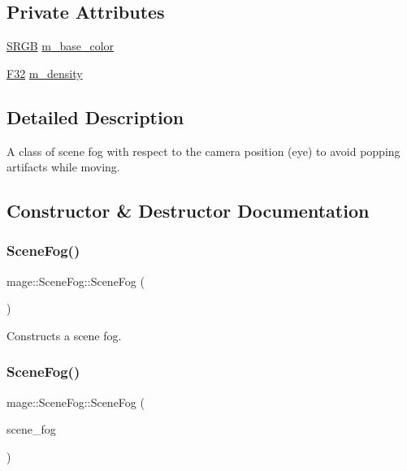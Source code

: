 \subsection*{Private Attributes}
\begin{DoxyCompactItemize}
\item 
\hyperlink{structmage_1_1_s_r_g_b}{S\+R\+GB} \hyperlink{classmage_1_1_scene_fog_aa5440867e5dc3dda9532899e98ff44ae}{m\+\_\+base\+\_\+color}
\item 
\hyperlink{namespacemage_aa97e833b45f06d60a0a9c4fc22ae02c0}{F32} \hyperlink{classmage_1_1_scene_fog_a16d4e67f373716f100ed6809c387b74c}{m\+\_\+density}
\end{DoxyCompactItemize}


\subsection{Detailed Description}
A class of scene fog with respect to the camera position (eye) to avoid popping artifacts while moving. 

\subsection{Constructor \& Destructor Documentation}
\hypertarget{classmage_1_1_scene_fog_a54e3afb5450b6c5bec90448aebcd63a5}{}\label{classmage_1_1_scene_fog_a54e3afb5450b6c5bec90448aebcd63a5} 
\subsubsection{\texorpdfstring{Scene\+Fog()}{SceneFog()}\hspace{0.1cm}{\footnotesize\ttfamily [1/3]}}
{\footnotesize\ttfamily mage\+::\+Scene\+Fog\+::\+Scene\+Fog (\begin{DoxyParamCaption}{ }\end{DoxyParamCaption})}

Constructs a scene fog. \hypertarget{classmage_1_1_scene_fog_a203934b340b718f9b6f136100df62268}{}\label{classmage_1_1_scene_fog_a203934b340b718f9b6f136100df62268} 
\subsubsection{\texorpdfstring{Scene\+Fog()}{SceneFog()}\hspace{0.1cm}{\footnotesize\ttfamily [2/3]}}
{\footnotesize\ttfamily mage\+::\+Scene\+Fog\+::\+Scene\+Fog (\begin{DoxyParamCaption}\item[{const \hyperlink{classmage_1_1_scene_fog}{Scene\+Fog} \&}]{scene\+\_\+fog }\end{DoxyParamCaption})\hspace{0.3cm}{\ttfamily [default]}}

